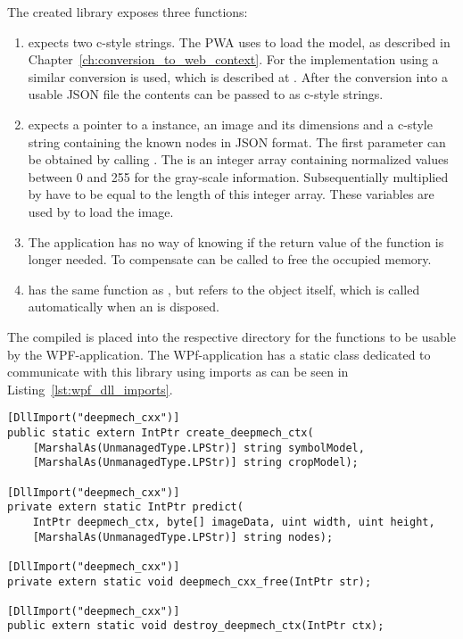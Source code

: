 The created library exposes three functions:
\begin{enumerate}
    \item {} expects two c-style strings.
        The PWA uses  to load the model, as described in Chapter~\ref{ch:conversion_to_web_context}.
        For the implementation using  a similar conversion is used, which is described at .
        After the conversion into a usable JSON file the contents can be passed to  as c-style strings.
    \item {} expects a pointer to a  instance, an image and its dimensions and a c-style string containing the known nodes in JSON format.
        The first parameter can be obtained by calling .
        The  is an integer array containing normalized values between 0 and 255 for the gray-scale information.
        Subsequentially  multiplied by  have to be equal to the length of this integer array. These variables are used by  to load the image.
    \item The application has no way of knowing if the return value of the  function is longer needed.
        To compensate  can be called to free the occupied memory.
    \item {} has the same function as , but refers to the  object itself, which is called automatically when an  is disposed.
\end{enumerate}

The compiled  is placed into the respective directory for the functions to be usable by the WPF-application.
The WPf-application has a static class dedicated to communicate with this library using imports as can be seen in Listing~\ref{lst:wpf_dll_imports}.

\begin{lstlisting}[label={lst:wpf_dll_imports}, caption={DllImports in the static Deepmech\_cxx class}]
[DllImport("deepmech_cxx")]
public static extern IntPtr create_deepmech_ctx(
    [MarshalAs(UnmanagedType.LPStr)] string symbolModel,
    [MarshalAs(UnmanagedType.LPStr)] string cropModel);

[DllImport("deepmech_cxx")]
private extern static IntPtr predict(
    IntPtr deepmech_ctx, byte[] imageData, uint width, uint height,
    [MarshalAs(UnmanagedType.LPStr)] string nodes);

[DllImport("deepmech_cxx")]
private extern static void deepmech_cxx_free(IntPtr str);

[DllImport("deepmech_cxx")]
public extern static void destroy_deepmech_ctx(IntPtr ctx);
\end{lstlisting}

